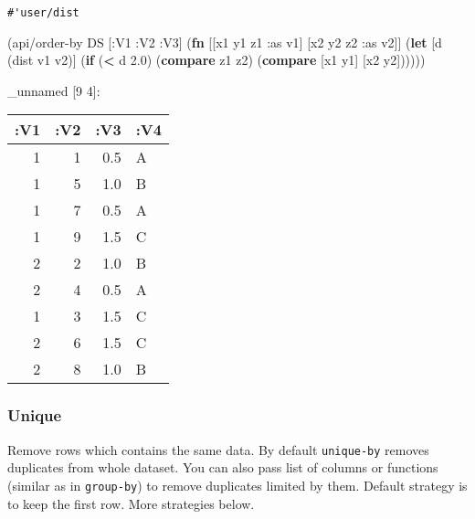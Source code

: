 \documentclass[]{article}
\newenvironment{Shaded}{\begin{snugshade}}{\end{snugshade}}
\newcommand{\KeywordTok}[1]{\textcolor[rgb]{0.13,0.29,0.53}{\textbf{#1}}}
\newcommand{\FloatTok}[1]{\textcolor[rgb]{0.00,0.00,0.81}{#1}}
\newcommand{\FunctionTok}[1]{\textcolor[rgb]{0.00,0.00,0.00}{#1}}
\newcommand{\VariableTok}[1]{\textcolor[rgb]{0.00,0.00,0.00}{#1}}
\newcommand{\BuiltInTok}[1]{#1}
\newcommand{\AttributeTok}[1]{\textcolor[rgb]{0.77,0.63,0.00}{#1}}
\newcommand{\NormalTok}[1]{#1}
\begin{document}
\begin{Shaded}
\end{Shaded}

\begin{verbatim}
#'user/dist
\end{verbatim}

\begin{Shaded}
\begin{Highlighting}[]
\NormalTok{(api/order-by DS [}\AttributeTok{:V1} \AttributeTok{:V2} \AttributeTok{:V3}\NormalTok{] (}\KeywordTok{fn}\NormalTok{ [[x1 y1 z1 }\AttributeTok{:as}\NormalTok{ v1] [x2 y2 z2 }\AttributeTok{:as}\NormalTok{ v2]]}
\NormalTok{                                 (}\KeywordTok{let}\NormalTok{ [d (dist v1 v2)]}
\NormalTok{                                   (}\KeywordTok{if}\NormalTok{ (}\KeywordTok{<}\NormalTok{ d }\FloatTok{2.0}\NormalTok{)}
\NormalTok{                                     (}\KeywordTok{compare}\NormalTok{ z1 z2)}
\NormalTok{                                     (}\KeywordTok{compare}\NormalTok{ [x1 y1] [x2 y2])))))}
\end{Highlighting}
\end{Shaded}

\_unnamed {[}9 4{]}:

\begin{longtable}[]{@{}rrrl@{}}
\toprule
:V1 & :V2 & :V3 & :V4\tabularnewline
\midrule
\endhead
1 & 1 & 0.5 & A\tabularnewline
1 & 5 & 1.0 & B\tabularnewline
1 & 7 & 0.5 & A\tabularnewline
1 & 9 & 1.5 & C\tabularnewline
2 & 2 & 1.0 & B\tabularnewline
2 & 4 & 0.5 & A\tabularnewline
1 & 3 & 1.5 & C\tabularnewline
2 & 6 & 1.5 & C\tabularnewline
2 & 8 & 1.0 & B\tabularnewline
\bottomrule
\end{longtable}

\subsubsection{Unique}\label{unique}

Remove rows which contains the same data. By default \texttt{unique-by}
removes duplicates from whole dataset. You can also pass list of columns
or functions (similar as in \texttt{group-by}) to remove duplicates
limited by them. Default strategy is to keep the first row. More
strategies below.
\end{document}
